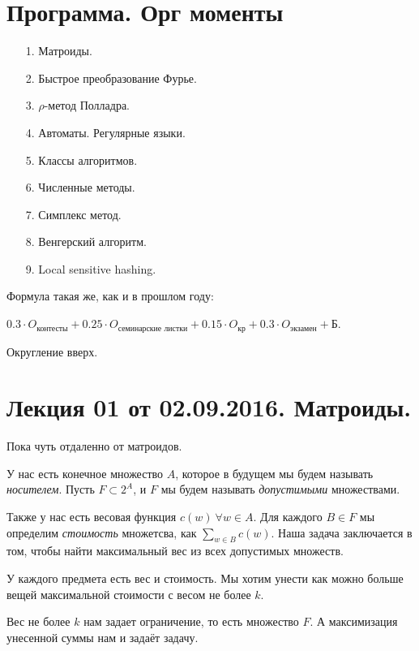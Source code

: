 \documentclass[a4paper, 12pt]{article}
\begin{document}
\pagestyle{fancy}

\section{Программа. Орг моменты}

\begin{itemize}
  \item[1.] Матроиды.
  \item[2.] Быстрое преобразование Фурье.
  \item[3.] $\rho$-метод Полладра.
  \item[4.] Автоматы. Регулярные языки.
  \item[5.] Классы алгоритмов.
  \item[6.] Численные методы.
  \item[7.] Симплекс метод.
  \item[8.] Венгерский алгоритм.
  \item[9.] Local sensitive hashing.
\end{itemize}

Формула такая же, как и в прошлом году: 

$0.3\cdot O_{\text{контесты}} + 0.25
\cdot O_{\text{семинарские листки}} + 0.15 \cdot O_{\text{кр}} + 0.3\cdot 
O_{\text{экзамен}} + \text{Б}$.

 Округление вверх.

\section{Лекция 01 от 02.09.2016. Матроиды.}

Пока чуть отдаленно от матроидов.

У нас есть конечное множество $A$, которое в будущем мы будем называть 
\textit{носителем}. Пусть $F \subset 2^{A}$, и $F$ мы будем называть 
\textit{допустимыми} множествами.

Также у нас есть весовая функция $c(w) \ \forall w \in A$. 
Для каждого $B \in F$ мы определим \textit{стоимость} 
множетсва, как $\sum\limits_{w \in B} c(w)$. Наша задача 
заключается в том, чтобы найти максимальный вес из всех допустимых множеств.

\begin{Examples}
У каждого предмета есть вес и стоимость. Мы хотим унести как можно больше 
вещей максимальной стоимости с весом не более $k$.

Вес не более $k$ нам задает ограничение, то есть множество $F$.
А максимизация унесенной суммы нам и задаёт задачу.
\end{Examples}
\end{document}
